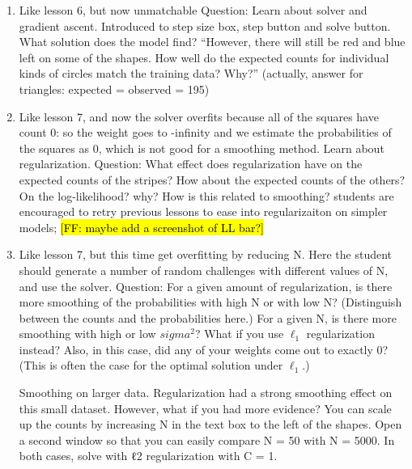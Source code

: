 \documentclass[11pt,letterpaper]{article}
\newcommand{\Note}[1]{}
\renewcommand{\Note}[1]{\hl{[#1]}}
\newcommand{\NoteSigned}[3]{{\sethlcolor{#2}\Note{#1: #3}}}
\newcommand{\NoteFF}[1]{\NoteSigned{FF}{LightBlue}{#1}}
\begin{document}
\begin{enumerate}
\item %
Like lesson 6, but now unmatchable 
Question: Learn about solver and gradient ascent. Introduced to step size box, step button and solve button.  What solution does the model find?
``However, there will still be red and blue left on some of the shapes. How well do the expected counts for individual kinds of circles match the training data? Why?'' (actually, answer for triangles: expected = observed = 195)
\item %
Like lesson 7, and now the solver overfits because all of the squares have count 0: so the weight goes to -infinity and we estimate the probabilities of the squares as 0, which is not good for a smoothing method.  Learn about regularization.  Question: What effect does regularization have on the expected counts of the stripes?  How about the expected counts of the others?  On the log-likelihood? why? How is this related to smoothing?  
students are encouraged to retry previous lessons to ease into regularizaiton on simpler models; \NoteFF{maybe add a screenshot of LL bar?}
\item %
Like lesson 7, but this time get overfitting by reducing N.  Here the student should generate a number of random challenges with different values of N, and use the solver.  Question: For a given amount of regularization, is there more smoothing of the probabilities with high N or with low N?  (Distinguish between the counts and the probabilities here.)  For a given N, is there more smoothing with high or low $sigma^2$?
What if you use $\ell_1$ regularization instead? Also, in this case, did any of your weights come out to exactly 0? (This is often the case for the optimal solution under $\ell_1$.)

Smoothing on larger data. Regularization had a strong smoothing effect on this small dataset. However, what if you had more evidence? You can scale up the counts by increasing N in the text box to the left of the shapes. Open a second window so that you can easily compare N = 50 with N = 5000. In both cases, solve with ℓ2 regularization with C = 1.


\end{enumerate}
\end{document}
